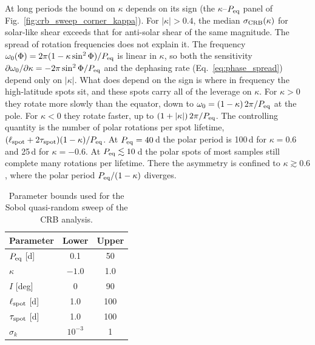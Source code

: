 \documentclass[preprint]{aastex702}
\begin{document}
At long periods the bound on $\kappa$ depends on its sign (the $\kappa$--$P_{\rm eq}$ panel of Fig.~\ref{fig:crb_sweep_corner_kappa}). For $|\kappa| > 0.4$, the median $\sigma_{\rm CRB}(\kappa)$ for solar-like shear exceeds that for anti-solar shear of the same magnitude. 
The spread of rotation frequencies does not explain it. The frequency $\omega_0(\Phi) = 2\pi(1 - \kappa\sin^2\Phi)/P_{\rm eq}$ is linear in $\kappa$, so both the sensitivity $\partial\omega_0/\partial\kappa = -2\pi\sin^2\Phi/P_{\rm eq}$ and the dephasing rate (Eq.~\ref{eq:phase_spread}) depend only on $|\kappa|$. What does depend on the sign is where in frequency the high-latitude spots sit, and these spots carry all of the leverage on $\kappa$. For $\kappa > 0$ they rotate more slowly than the equator, down to $\omega_0 = (1 - \kappa)\,2\pi/P_{\rm eq}$ at the pole. For $\kappa < 0$ they rotate faster, up to $(1 + |\kappa|)\,2\pi/P_{\rm eq}$.
The controlling quantity is the number of polar rotations per spot lifetime, $(\ell_{\rm spot} + 2\tau_{\rm spot})(1 - \kappa)/P_{\rm eq}$. At $P_{\rm eq} = 40$\,d the polar period is 100\,d for $\kappa = 0.6$ and 25\,d for $\kappa = -0.6$. At $P_{\rm eq} \lesssim 10$\,d the polar spots of most samples still complete many rotations per lifetime. There the asymmetry is confined to $\kappa \gtrsim 0.6$, where the polar period $P_{\rm eq}/(1 - \kappa)$ diverges.

\begin{table}[ht!]
    \centering
    \caption{Parameter bounds used for the Sobol quasi-random sweep of the CRB analysis.}
    \label{tab:crb_bounds}
    \begin{tabular}{lcc}
        \hline
        Parameter & Lower & Upper \\
        \hline
        $P_{\rm eq}$ [d] & 0.1 & 50 \\
        $\kappa$ & $-1.0$ & 1.0 \\
        $I$ [deg] & 0 & 90 \\
        $\ell_{\rm spot}$ [d] & 1.0 & 100 \\
        $\tau_{\rm spot}$ [d] & 1.0 & 100 \\
        $\sigma_k$ & $10^{-3}$ & 1 \\
        \hline
    \end{tabular}
\end{table}
\end{document}

